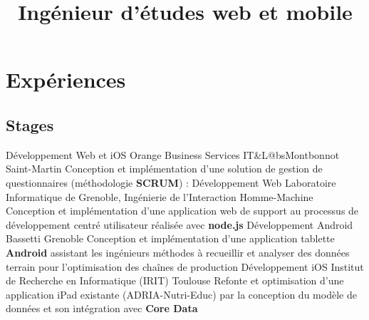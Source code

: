 \documentclass[10pt,a4paper]{moderncv}
\title{Ingénieur d'études web et mobile}
\begin{document}
\maketitle

\vspace{-1.1cm}

\section{Expériences}
\subsection{Stages}
{Développement Web et iOS}
{Orange Business Services IT\&L@bs}{Montbonnot Saint-Martin}{}
{Conception et implémentation d'une solution de gestion de questionnaires (méthodologie \textbf{SCRUM}) :}
{Développement Web}
{Laboratoire Informatique de Grenoble, Ingénierie de l'Interaction Homme-Machine}
{}
{}
{Conception et implémentation d'une application web de support au processus de développement centré utilisateur réalisée avec \textbf{node.js}}
{Développement Android}
{Bassetti}
{Grenoble}
{}
{Conception et implémentation d'une application tablette \textbf{Android} assistant les ingénieurs méthodes à recueillir et analyser des données terrain pour l'optimisation des chaînes de production}   
{Développement iOS
}{Institut de Recherche en Informatique (IRIT)}
{Toulouse}
{}{
Refonte et optimisation d'une application iPad existante (ADRIA-Nutri-Educ) par la conception du modèle de données et son intégration avec \textbf{Core Data}}   

\end{document}
